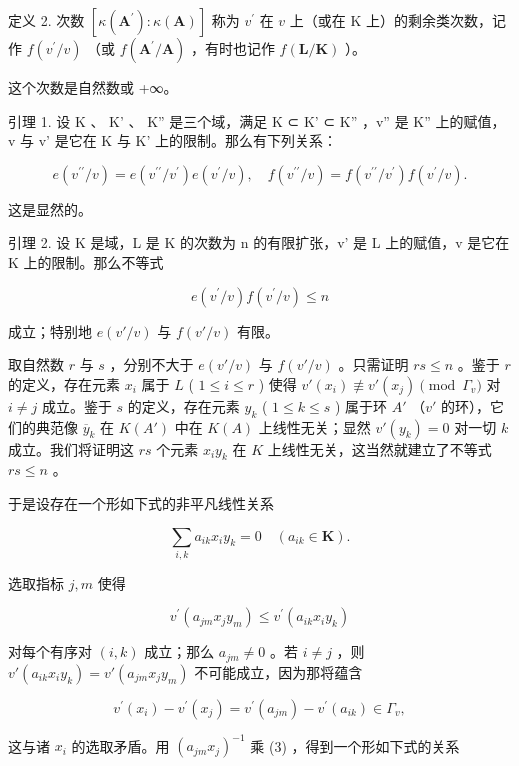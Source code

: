定义 2. 次数 \([\kappa (\mathbf{A}^{\prime}):\kappa (\mathbf{A})]\) 称为 \(v^{\prime}\) 在 \(v\) 上（或在 K 上）的剩余类次数，记作 \(f(v^{\prime} / v)\) （或 \(f(\mathbf{A}^{\prime} / \mathbf{A})\) ，有时也记作 \(f(\mathbf{L} / \mathbf{K})\) ）。

这个次数是自然数或 +∞。

引理 1. 设 K 、 K' 、 K'' 是三个域，满足 K ⊂ K' ⊂ K'' ，v'' 是 K'' 上的赋值，v 与 v' 是它在 K 与 K' 上的限制。那么有下列关系：

\[
e (v ^ {\prime \prime} / v) = e (v ^ {\prime \prime} / v ^ {\prime}) e (v ^ {\prime} / v), \quad f (v ^ {\prime \prime} / v) = f (v ^ {\prime \prime} / v ^ {\prime}) f (v ^ {\prime} / v).\tag{1}
\]

这是显然的。

引理 2. 设 K 是域，L 是 K 的次数为 n 的有限扩张，v' 是 L 上的赋值，v 是它在 K 上的限制。那么不等式

\[
e (v ^ {\prime} / v) f (v ^ {\prime} / v) \leqslant n\tag{2}
\]

成立；特别地 \(e(v' / v)\) 与 \(f(v' / v)\) 有限。

取自然数 \(r\) 与 \(s\) ，分别不大于 \(e(v'/v)\) 与 \(f(v'/v)\) 。只需证明 \(rs \leqslant n\) 。鉴于 \(r\) 的定义，存在元素 \(x_i\) 属于 \(L\) ( \(1 \leqslant i \leqslant r\) ) 使得 \(v'(x_i) \not\equiv v'(x_j) \pmod{\Gamma_v}\) 对 \(i \neq j\) 成立。鉴于 \(s\) 的定义，存在元素 \(y_k\) ( \(1 \leqslant k \leqslant s\) ) 属于环 \(A'\) （\(v'\) 的环），它们的典范像 \(\overline{y}_k\) 在 \(K(A')\) 中在 \(K(A)\) 上线性无关；显然 \(v'(y_k) = 0\) 对一切 \(k\) 成立。我们将证明这 \(rs\) 个元素 \(x_i y_k\) 在 \(K\) 上线性无关，这当然就建立了不等式 \(rs \leqslant n\) 。

于是设存在一个形如下式的非平凡线性关系

\[
\sum_ {i, k} a _ {i k} x _ {i} y _ {k} = 0 \quad (a _ {i k} \in \mathbf {K}).\tag{3}
\]

选取指标 \(j, m\) 使得

\[
v ^ {\prime} (a _ {j m} x _ {j} y _ {m}) \leqslant v ^ {\prime} (a _ {i k} x _ {i} y _ {k})
\]

对每个有序对 \((i,k)\) 成立；那么 \(a_{jm} \neq 0\) 。若 \(i \neq j\) ，则 \(v'(a_{ik}x_iy_k) = v'(a_{jm}x_jy_m)\) 不可能成立，因为那将蕴含

\[
v ^ {\prime} (x _ {i}) - v ^ {\prime} (x _ {j}) = v ^ {\prime} (a _ {j m}) - v ^ {\prime} (a _ {i k}) \in \Gamma_ {v},
\]

这与诸 \(x_{i}\) 的选取矛盾。用 \((a_{jm}x_j)^{-1}\) 乘 (3) ，得到一个形如下式的关系

